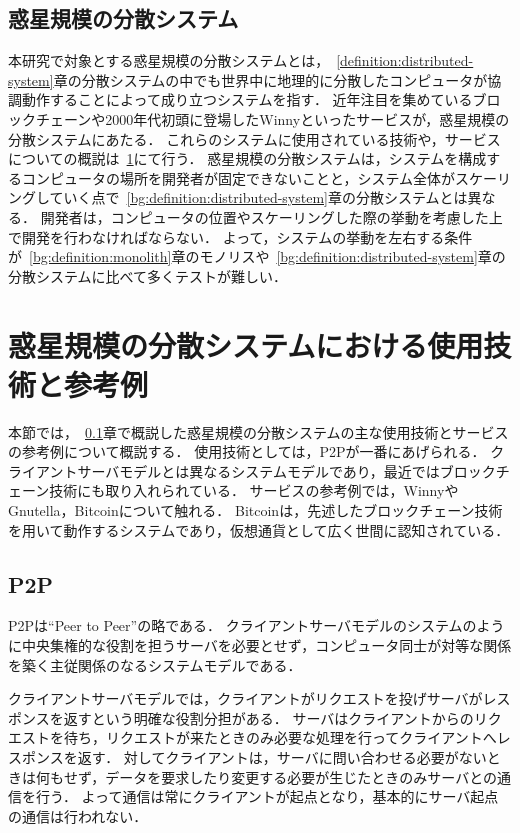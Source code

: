 \subsection{惑星規模の分散システム}
\label{bg:definition:planetary-scale-distributed-system}

本研究で対象とする惑星規模の分散システムとは，~\ref{definition:distributed-system}章の分散システムの中でも世界中に地理的に分散したコンピュータが協調動作することによって成り立つシステムを指す．
近年注目を集めているブロックチェーンや2000年代初頭に登場したWinnyといったサービスが，惑星規模の分散システムにあたる．
これらのシステムに使用されている技術や，サービスについての概説は~\ref{bg:planetary-scale-distributed-system}にて行う．
惑星規模の分散システムは，システムを構成するコンピュータの場所を開発者が固定できないことと，システム全体がスケーリングしていく点で~\ref{bg:definition:distributed-system}章の分散システムとは異なる．
開発者は，コンピュータの位置やスケーリングした際の挙動を考慮した上で開発を行わなければならない．
よって，システムの挙動を左右する条件が~\ref{bg:definition:monolith}章のモノリスや~\ref{bg:definition:distributed-system}章の分散システムに比べて多くテストが難しい．

\section{惑星規模の分散システムにおける使用技術と参考例}
\label{bg:planetary-scale-distributed-system}

本節では，~\ref{bg:definition:planetary-scale-distributed-system}章で概説した惑星規模の分散システムの主な使用技術とサービスの参考例について概説する．
使用技術としては，P2Pが一番にあげられる．
クライアントサーバモデルとは異なるシステムモデルであり，最近ではブロックチェーン技術にも取り入れられている．
サービスの参考例では，WinnyやGnutella，Bitcoinについて触れる．
Bitcoinは，先述したブロックチェーン技術を用いて動作するシステムであり，仮想通貨として広く世間に認知されている．

\subsection{P2P}
\label{bg:planetary-scale-distributed-system:p2p}

P2Pは``Peer to Peer''の略である．
クライアントサーバモデルのシステムのように中央集権的な役割を担うサーバを必要とせず，コンピュータ同士が対等な関係を築く主従関係のなるシステムモデルである．

クライアントサーバモデルでは，クライアントがリクエストを投げサーバがレスポンスを返すという明確な役割分担がある．
サーバはクライアントからのリクエストを待ち，リクエストが来たときのみ必要な処理を行ってクライアントへレスポンスを返す．
対してクライアントは，サーバに問い合わせる必要がないときは何もせず，データを要求したり変更する必要が生じたときのみサーバとの通信を行う．
よって通信は常にクライアントが起点となり，基本的にサーバ起点の通信は行われない．

